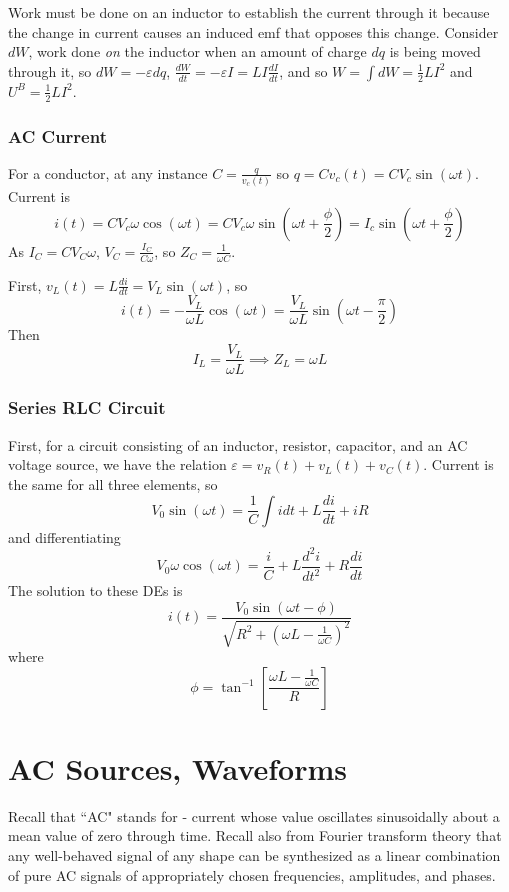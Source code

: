 Work must be done on an inductor to establish the current through it because the change in current causes an induced emf that opposes this change. Consider $dW$, work done \emph{on} the inductor when an amount of charge $dq$ is being moved through it, so $dW = -\varepsilon dq$, $\frac{dW}{dt} = -\varepsilon I = LI\frac{dI}{dt}$, and so $W = \int dW = \frac{1}{2}LI^2$ and $U^B = \frac{1}{2}LI^2$.

\subsection{AC Current}

For a conductor, at any instance $C = \frac{q}{v_c(t)}$ so $q = Cv_c(t) = CV_c\sin(\omega t)$. Current is $$i(t) = CV_c\omega \cos(\omega t) = CV_c\omega\sin\left(\omega t + \frac{\phi}{2}\right) = I_c\sin\left(\omega t+\frac{\phi}{2}\right)$$ As $I_C = CV_C\omega$, $V_C = \frac{I_C}{C\omega}$, so $Z_C = \frac{1}{\omega C}$.

First, $v_L(t) = L\frac{di}{dt} = V_L\sin(\omega t)$, so $$i(t) = -\frac{V_L}{\omega L}\cos(\omega t) = \frac{V_L}{\omega L}\sin\left(\omega t -\frac{\pi}{2}\right)$$ Then $$I_L = \frac{V_L}{\omega L}\implies Z_L = \omega L$$

\subsection{Series RLC Circuit}

First, for a circuit consisting of an inductor, resistor, capacitor, and an AC voltage source, we have the relation $\varepsilon = v_R(t) + v_L(t) + v_C(t)$. Current is the same for all three elements, so $$V_0\sin(\omega t) = \frac{1}{C}\int idt + L\frac{di}{dt}+iR$$ and differentiating $$V_0\omega \cos(\omega t) = \frac{i}{C} + L\frac{d^2i}{dt^2} + R\frac{di}{dt}$$ The solution to these DEs is $$i(t) = \frac{V_0\sin(\omega t-\phi)}{\sqrt{R^2 + \left(\omega L - \frac{1}{\omega C}\right)^2}}$$ where $$\phi = \tan^{-1}\left[\frac{\omega L - \frac{1}{\omega C}}{R}\right]$$




\chapter{AC Sources, Waveforms}

Recall that ``AC" stands for  - current whose value oscillates sinusoidally about a mean value of zero through time. Recall also from Fourier transform theory that any well-behaved signal of any shape can be synthesized as a linear combination of pure AC signals of appropriately chosen frequencies, amplitudes, and phases.

